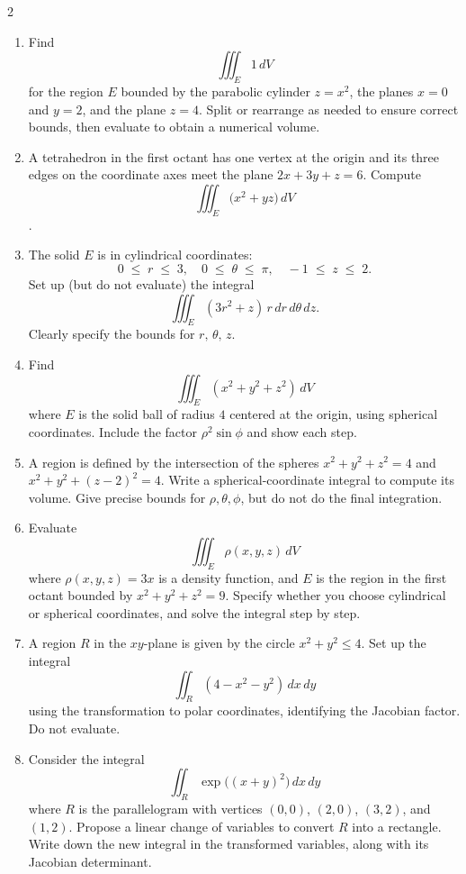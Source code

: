 \begin{multicols}{2}
\begin{enumerate}
\item 
Find
\[
\iiint_E 1\,dV
\]
for the region \(E\) bounded by the parabolic cylinder \(z = x^2\), the planes \(x=0\) and \(y=2\), and the plane \(z=4\). Split or rearrange as needed to ensure correct bounds, then evaluate to obtain a numerical volume.

\item A tetrahedron in the first octant has one vertex at the origin and its three edges on the coordinate axes meet the plane \(2x + 3y + z = 6\). Compute
\[
\iiint_E \bigl(x^2 + yz\bigr)\,dV
\].

\item The solid \(E\) is in cylindrical coordinates:
\[
0 \;\le\; r \;\le\; 3, 
\quad 0 \;\le\; \theta \;\le\; \pi, 
\quad -1 \;\le\; z \;\le\; 2.
\]
Set up (but do not evaluate) the integral 
\[
\iiint_E (3r^2 + z)\,r\,dr\,d\theta\,dz.
\]
Clearly specify the bounds for \(r,\,\theta,\,z\).

\item Find
\[
\iiint_E (x^2 + y^2 + z^2)\,dV
\]
where \(E\) is the solid ball of radius \(4\) centered at the origin, using spherical coordinates. Include the factor \(\rho^2 \sin\phi\) and show each step.

\item A region is defined by the intersection of the spheres \(x^2 + y^2 + z^2 = 4\) and \(x^2 + y^2 + (z - 2)^2 = 4\). Write a spherical-coordinate integral to compute its volume. Give precise bounds for \(\rho,\theta,\phi\), but do not do the final integration.

\item Evaluate
\[
\iiint_E \rho(x,y,z)\,dV
\]
where \(\rho(x,y,z)=3x\) is a density function, and \(E\) is the region in the first octant bounded by \(x^2 + y^2 + z^2 = 9\). Specify whether you choose cylindrical or spherical coordinates, and solve the integral step by step.

\item A region $R$ in the $xy$-plane is given by the circle $x^2 + y^2 \le 4$. Set up the integral
\[
\iint_R (4 - x^2 - y^2)\,dx\,dy
\]
using the transformation to polar coordinates, identifying the Jacobian factor. Do not evaluate.

\item Consider the integral
\[
\iint_{R} \exp\!\bigl((x+y)^2\bigr)\,dx\,dy
\]
where $R$ is the parallelogram with vertices $(0,0)$, $(2,0)$, $(3,2)$, and $(1,2)$. Propose a linear change of variables to convert $R$ into a rectangle. Write down the new integral in the transformed variables, along with its Jacobian determinant.


\end{enumerate}
\end{multicols}
